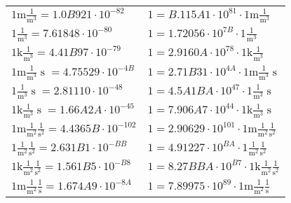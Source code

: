 \begin{center}
\begin{longtable}{l l}
{\color{gray}$1 \bm{\mathrm{ m}}\frac1{\operatorname{m}^3}{}{}{} = 1.0B921\cdot10^{-82} $}   & {\color{gray}$ 1 = B.115A1\cdot10^{81} \cdot 1 \bm{\mathrm{ m}}\frac1{\operatorname{m}^3}{}{}{}$}  \\
{\color{black}$1 \bm{\mathrm{ }}\frac1{\operatorname{m}^3}{}{}{} = 7.61848\cdot10^{-80} $}   & {\color{black}$ 1 = 1.72056\cdot10^{7B} \cdot 1 \bm{\mathrm{ }}\frac1{\operatorname{m}^3}{}{}{}$}  \\
{\color{gray}$1 \bm{\mathrm{ k}}\frac1{\operatorname{m}^3}{}{}{} = 4.41B97\cdot10^{-79} $}   & {\color{gray}$ 1 = 2.9160A\cdot10^{78} \cdot 1 \bm{\mathrm{ k}}\frac1{\operatorname{m}^3}{}{}{}$}  \\
{\color{gray}$1 \bm{\mathrm{ m}}\frac1{\operatorname{m}^3}{\operatorname{s}}{}{} = 4.75529\cdot10^{-4B} $}   & {\color{gray}$ 1 = 2.71B31\cdot10^{4A} \cdot 1 \bm{\mathrm{ m}}\frac1{\operatorname{m}^3}{\operatorname{s}}{}{}$}  \\
{\color{black}$1 \bm{\mathrm{ }}\frac1{\operatorname{m}^3}{\operatorname{s}}{}{} = 2.81110\cdot10^{-48} $}   & {\color{black}$ 1 = 4.5A1BA\cdot10^{47} \cdot 1 \bm{\mathrm{ }}\frac1{\operatorname{m}^3}{\operatorname{s}}{}{}$}  \\
{\color{gray}$1 \bm{\mathrm{ k}}\frac1{\operatorname{m}^3}{\operatorname{s}}{}{} = 1.66A2A\cdot10^{-45} $}   & {\color{gray}$ 1 = 7.906A7\cdot10^{44} \cdot 1 \bm{\mathrm{ k}}\frac1{\operatorname{m}^3}{\operatorname{s}}{}{}$}  \\
{\color{gray}$1 \bm{\mathrm{ m}}\frac1{\operatorname{m}^2}\frac1{\operatorname{s}^2}{}{} = 4.4365B\cdot10^{-102} $}   & {\color{gray}$ 1 = 2.90629\cdot10^{101} \cdot 1 \bm{\mathrm{ m}}\frac1{\operatorname{m}^2}\frac1{\operatorname{s}^2}{}{}$}  \\
{\color{black}$1 \bm{\mathrm{ }}\frac1{\operatorname{m}^2}\frac1{\operatorname{s}^2}{}{} = 2.631B1\cdot10^{-BB} $}   & {\color{black}$ 1 = 4.91227\cdot10^{BA} \cdot 1 \bm{\mathrm{ }}\frac1{\operatorname{m}^2}\frac1{\operatorname{s}^2}{}{}$}  \\
{\color{gray}$1 \bm{\mathrm{ k}}\frac1{\operatorname{m}^2}\frac1{\operatorname{s}^2}{}{} = 1.561B5\cdot10^{-B8} $}   & {\color{gray}$ 1 = 8.27BBA\cdot10^{B7} \cdot 1 \bm{\mathrm{ k}}\frac1{\operatorname{m}^2}\frac1{\operatorname{s}^2}{}{}$}  \\
{\color{gray}$1 \bm{\mathrm{ m}}\frac1{\operatorname{m}^2}\frac1{\operatorname{s}}{}{} = 1.674A9\cdot10^{-8A} $}   & {\color{gray}$ 1 = 7.89975\cdot10^{89} \cdot 1 \bm{\mathrm{ m}}\frac1{\operatorname{m}^2}\frac1{\operatorname{s}}{}{}$}  \\

\end{longtable}
\end{center}
